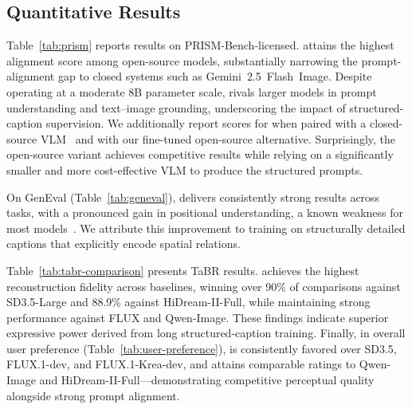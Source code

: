 \subsection{Quantitative Results}
\label{sec:Quantitative_Results}

Table~\ref{tab:prism} reports results on PRISM-Bench-licensed. \modelname{} attains the highest alignment score among open-source models, substantially narrowing the prompt-alignment gap to closed systems such as Gemini~2.5~Flash~Image. Despite operating at a moderate 8B parameter scale, \modelname{} rivals larger models in prompt understanding and text–image grounding, underscoring the impact of structured-caption supervision.
We additionally report scores for \modelname{} when paired with a closed-source VLM~\cite{comanici2025gemini} and with our fine-tuned open-source alternative. Surprisingly, the open-source variant achieves competitive results while relying on a significantly smaller and more cost-effective VLM to produce the structured prompts.

On GenEval (Table~\ref{tab:geneval}), \modelname{} delivers consistently strong results across tasks, with a pronounced gain in positional understanding, a known weakness for most models~\cite{ghosh2023geneval}. We attribute this improvement to training on structurally detailed captions that explicitly encode spatial relations.

Table~\ref{tab:tabr-comparison} presents TaBR results. \modelname{} achieves the highest reconstruction fidelity across baselines, winning over 90\% of comparisons against SD3.5-Large and 88.9\% against HiDream-II-Full, while maintaining strong performance against FLUX and Qwen-Image. These findings indicate superior expressive power derived from long structured-caption training. Finally, in overall user preference (Table~\ref{tab:user-preference}), \modelname{} is consistently favored over SD3.5, FLUX.1-dev, and FLUX.1-Krea-dev, and attains comparable ratings to Qwen-Image and HiDream-II-Full—demonstrating competitive perceptual quality alongside strong prompt alignment.








